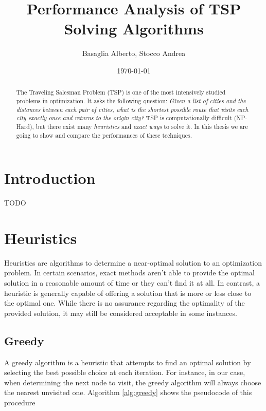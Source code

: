 \documentclass{article}
\title{Performance Analysis of TSP Solving Algorithms}
\author{Basaglia Alberto, Stocco Andrea}
\date{\today}
\begin{document}
\maketitle

\begin{abstract}
	The Traveling Salesman Problem (TSP) is one of the most intensively studied problems in optimization.
	It asks the following question:
	\textit{Given a list of cities and the distances between each pair of cities, what is the shortest possible route
	that visits each city exactly once and returns to the origin city?}
	TSP is computationally difficult (NP-Hard), but there exist many \textit{heuristics} and \textit{exact ways} to solve it.
	In this thesis we are going to show and compare the performances of these
        techniques.
\end{abstract}

\section{Introduction}
TODO

\section{Heuristics}
Heuristics are algorithms to determine a near-optimal solution to an optimization problem. In certain scenarios,
exact methods aren't able to provide the optimal solution in a reasonable amount of time or they can't find it
at all. In contrast, a heuristic is generally capable of offering a solution that is more or less close to
the optimal one.
While there is no assurance regarding the optimality of the provided solution, it may still be considered
acceptable in some instances.

\subsection{Greedy}
A greedy algorithm is a heuristic that attempts to find an optimal solution by selecting the best possible choice at each iteration.
For instance, in our case, when determining the next node to visit, the greedy algorithm will always choose
the nearest unvisited one. Algorithm \ref{alg:greedy} shows the pseudocode of this procedure
\end{document}
